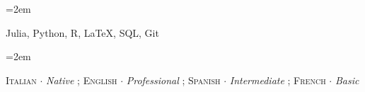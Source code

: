 \documentclass{scrartcl}
\newcommand{\MarginText}[1]{\marginpar{\raggedleft\itshape\small#1}} %
\newcommand{\Description}[1]{\hangindent=2em\hangafter=0\noindent\raggedright\footnotesize{#1}\par\normalsize\vspace{1em}} %
\begin{document}
\begin{cv}{}
\fi 







\vspace{1em}

\Description{\MarginText{} Julia, Python, \textsc{R}, \LaTeX, SQL, Git}



\vspace{0.5em}

\Description{\MarginText{} \textsc{Italian} $\cdotp$ \emph{Native} ; \textsc{English} $\cdotp$ \emph{Professional} ; \textsc{Spanish} $\cdotp$ \emph{Intermediate} ; \textsc{French} $\cdotp$ \emph{Basic}}
\iffalse 
\newlength{\langbox} %
\settowidth{\langbox}{English} %

\Description{\parbox{\langbox}{\textsc{Italian}}\ \ $\cdotp$\ \ \ Native}

\vspace{-0.5em} %

\Description{\parbox{\langbox}{\textsc{English}}\ \ $\cdotp$\ \ \ Professional }

\vspace{-0.5em} %

\Description{\parbox{\langbox}{\textsc{Spanish}}\ \ $\cdotp$\ \ \ Intermediate }

\vspace{-0.5em} %

\Description{\parbox{\langbox}{\textsc{French}}\ \ $\cdotp$\ \ \ Basic }

\vspace{-1em} %
\fi 


\end{cv}
\end{document}
